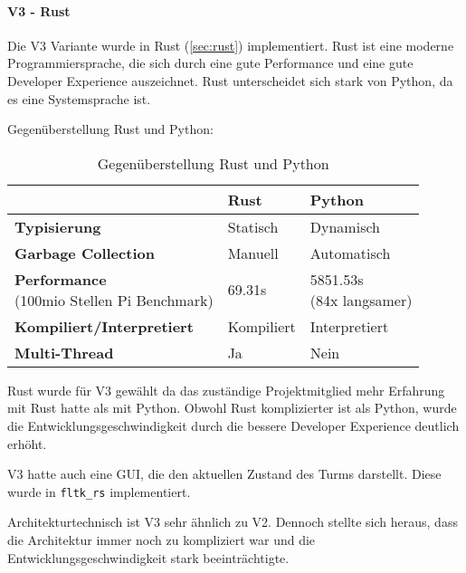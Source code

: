\paragraph{V3 - Rust}
Die V3 Variante wurde in Rust (\ref{sec:rust}) implementiert. Rust ist eine moderne Programmiersprache, die sich durch eine gute Performance und eine gute Developer Experience auszeichnet. Rust unterscheidet sich stark von Python, da es eine Systemsprache ist.

Gegenüberstellung Rust und Python:
\begin{table}[H]
  \begin{tabular}{l|l|l}
                                      & \textbf{Rust} & \textbf{Python}       \\
    \hline
    \textbf{Typisierung}              & Statisch      & Dynamisch             \\
    \textbf{Garbage Collection}       & Manuell       & Automatisch           \\
    \makecell[l]{\textbf{Performance }                                        \\(100mio Stellen Pi Benchmark\cite{programming_language_speeds})}
                                      & 69.31s        & \makecell[l]{5851.53s \\(84x langsamer)} \\
    \textbf{Kompiliert/Interpretiert} & Kompiliert    & Interpretiert         \\
    \textbf{Multi-Thread}             & Ja            & Nein                  \\
  \end{tabular}
  \caption{Gegenüberstellung Rust und Python}
  \label{tab:rust_vs_python}
\end{table}

Rust wurde für V3 gewählt da das zuständige Projektmitglied mehr Erfahrung mit Rust hatte als mit Python. Obwohl Rust komplizierter ist als Python, wurde die Entwicklungsgeschwindigkeit durch die bessere Developer Experience deutlich erhöht.

V3 hatte auch eine \ac{GUI}, die den aktuellen Zustand des Turms darstellt. Diese wurde in \texttt{fltk\_rs} implementiert.

Architekturtechnisch ist V3 sehr ähnlich zu V2. Dennoch stellte sich heraus, dass die Architektur immer noch zu kompliziert war und die Entwicklungsgeschwindigkeit stark beeinträchtigte.
